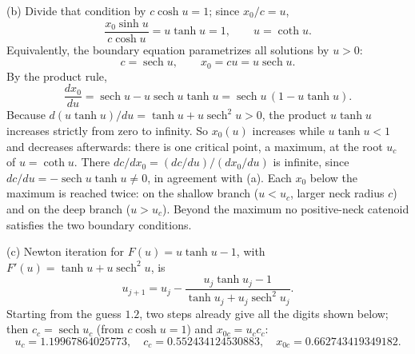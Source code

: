 (b) Divide that condition by $c\cosh u=1$; since $x_0/c=u$,
\[
\frac{x_0\sinh u}{c\cosh u}=u\tanh u=1,\qquad \boxed{u=\coth u}.
\]
Equivalently, the boundary equation parametrizes all solutions by
$u>0$:
\[
c=\operatorname{sech}u,\qquad x_0=cu=u\operatorname{sech}u.
\]
By the product rule,
\[
\frac{dx_0}{du}=\operatorname{sech}u-u\operatorname{sech}u\tanh u
=\operatorname{sech}u\,(1-u\tanh u).
\]
Because $d(u\tanh u)/du=\tanh u+u\operatorname{sech}^2u>0$, the
product $u\tanh u$ increases strictly from zero to infinity. So $x_0(u)$
increases while $u\tanh u<1$ and decreases afterwards: there is one
critical point, a maximum, at the root $u_c$ of $u=\coth u$. There
$dc/dx_0=(dc/du)/(dx_0/du)$ is infinite, since
$dc/du=-\operatorname{sech}u\tanh u\ne0$, in agreement with (a).
Each $x_0$ below the maximum is reached twice: on the shallow branch
($u<u_c$, larger neck radius $c$) and on the deep branch ($u>u_c$).
Beyond the maximum no positive-neck catenoid satisfies the two boundary
conditions.

(c) Newton iteration for $F(u)=u\tanh u-1$, with
$F'(u)=\tanh u+u\operatorname{sech}^2u$, is
\[
u_{j+1}=u_j-
\frac{u_j\tanh u_j-1}{\tanh u_j+u_j\operatorname{sech}^2u_j}.
\]
Starting from the guess $1.2$, two steps already give all the digits
shown below; then $c_c=\operatorname{sech}u_c$ (from $c\cosh u=1$) and
$x_{0c}=u_cc_c$:
\[
\boxed{u_c=1.19967864025773,\quad
c_c=0.552434124530883,\quad
x_{0c}=0.662743419349182}.
\]

